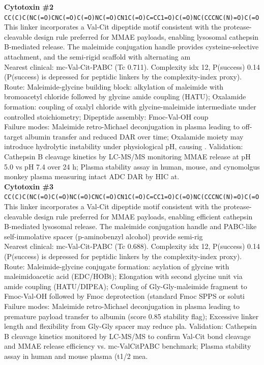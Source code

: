 \documentclass[10pt]{article}
\begin{document}
\noindent\textbf{Cytotoxin \#2} \\ \texttt{CC(C)C(NC(=O)CNC(=O)C(=O)NC(=O)CN1C(=O)C=CC1=O)C(=O)NC(CCCNC(N)=O)C(=O} \\ This linker incorporates a Val-Cit dipeptide motif consistent with the protease-cleavable design rule preferred for MMAE payloads, enabling lysosomal cathepsin B-mediated release. The maleimide conjugation handle provides cysteine-selective attachment, and the semi-rigid scaffold with alternating am \\ Nearest clinical: mc-Val-Cit-PABC (Tc 0.711). Complexity idx 12, P(success) 0.14 (P(success) is depressed for peptidic linkers by the complexity-index proxy). \\ Route: Maleimide-glycine building block: alkylation of maleimide with bromoacetyl chloride followed by glycine amide coupling (HATU); Oxalamide formation: coupling of oxalyl chloride with glycine-maleimide intermediate under controlled stoichiometry; Dipeptide assembly: Fmoc-Val-OH coup \\ Failure modes: Maleimide retro-Michael deconjugation in plasma leading to off-target albumin transfer and reduced DAR over time; Oxalamide moiety may introduce hydrolytic instability under physiological pH, causing . Validation: Cathepsin B cleavage kinetics by LC-MS/MS monitoring MMAE release at pH 5.0 vs pH 7.4 over 24 h; Plasma stability assay in human, mouse, and cynomolgus monkey plasma measuring intact ADC DAR by HIC at. \\[0.4em]
\noindent\textbf{Cytotoxin \#3} \\ \texttt{CC(C)C(NC(=O)C(=O)NC(=O)CNC(=O)CN1C(=O)C=CC1=O)C(=O)NC(CCCNC(N)=O)C(=O} \\ This linker incorporates a Val-Cit dipeptide motif consistent with the protease-cleavable design rule preferred for MMAE payloads, enabling efficient cathepsin B-mediated lysosomal release. The maleimide conjugation handle and PABC-like self-immolative spacer (p-aminobenzyl alcohol) provide semi-rig \\ Nearest clinical: mc-Val-Cit-PABC (Tc 0.688). Complexity idx 12, P(success) 0.14 (P(success) is depressed for peptidic linkers by the complexity-index proxy). \\ Route: Maleimide-glycine conjugate formation: acylation of glycine with maleimidoacetic acid (EDC/HOBt); Elongation with second glycine unit via amide coupling (HATU/DIPEA); Coupling of Gly-Gly-maleimide fragment to Fmoc-Val-OH followed by Fmoc deprotection (standard Fmoc SPPS or soluti \\ Failure modes: Maleimide retro-Michael deconjugation in plasma leading to premature payload transfer to albumin (score 0.85 stability flag); Excessive linker length and flexibility from Gly-Gly spacer may reduce pla. Validation: Cathepsin B cleavage kinetics monitored by LC-MS/MS to confirm Val-Cit bond cleavage and MMAE release efficiency vs. mc-ValCitPABC benchmark; Plasma stability assay in human and mouse plasma (t1/2 mea. \\[0.4em]
\end{document}
